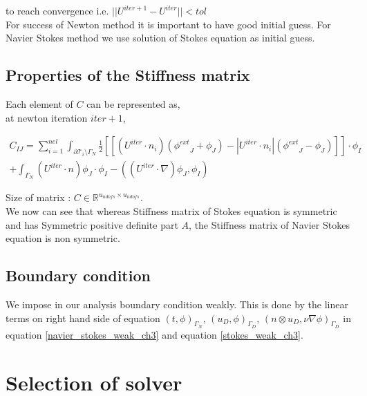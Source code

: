 \documentclass[a4paper]{book}
\begin{document}
to reach convergence i.e. $||U^{iter+1} - U^{iter}|| < tol$\\

For success of Newton method it is important to have good initial guess. For Navier Stokes method we use solution of Stokes equation as initial guess.

\subsection{Properties of the Stiffness matrix} \label{property_stif_mat_navier}

Each element of $C$ can be represented as,\\

at newton iteration $iter + 1$,
\begin{flushleft}
\begin{equation} \label{matric C}
\begin{split}
C_{IJ} = \sum_{i=1}^{nel} \int_{\partial \mathcal{T}_i \setminus \Gamma_N} \frac{1}{2} [[(U^{iter} \cdot n_i)({\phi^{ext}}_J + {\phi}_J ) - |U^{iter} \cdot n_i|({{\phi}^{ext}}_J - {\phi}_J)]] \cdot \phi_I \\ + \int_{\Gamma_N} (U^{iter} \cdot n) \phi_J \cdot \phi_I -((U^{iter} \cdot \nabla)\phi_J,\phi_I)
\end{split}
\end{equation}
\end{flushleft}

Size of matrix : $C \in \mathbb{R}^{u_{ndofs} \times u_{ndofs}}$. \\

We now can see that whereas Stiffness matrix of Stokes equation is symmetric and has Symmetric positive definite part $A$, the Stiffness matrix of Navier Stokes equation is non symmetric.

\subsection{Boundary condition}

We impose in our analysis boundary condition weakly. This is done by the linear terms on right hand side of equation  $(t,\phi)_{\Gamma_N}$, $(u_D,\phi)_{\Gamma_D}$, \linebreak $(n \otimes u_D, \nu \nabla \phi)_{\Gamma_D}$ in equation \ref{navier_stokes_weak_ch3} and equation \ref{stokes_weak_ch3}.

\section{Selection of solver}
\end{document}
